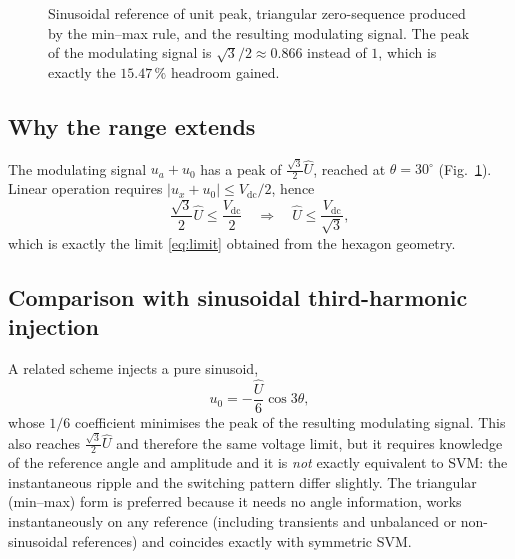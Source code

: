 \documentclass[11pt,a4paper]{article}
\newcommand{\vdc}{V_{\mathrm{dc}}}
\begin{document}
\begin{figure}[h]
\centering
{}
\caption{Sinusoidal reference of unit peak, triangular zero-sequence produced by the
min--max rule, and the resulting modulating signal. The peak of the modulating signal
is $\sqrt{3}/2 \approx 0.866$ instead of $1$, which is exactly the $15.47\,\%$
headroom gained.}
\label{fig:inj}
\end{figure}

\subsection{Why the range extends}

The modulating signal $u_a + u_0$ has a peak of $\tfrac{\sqrt{3}}{2}\hat U$, reached
at $\theta = 30^\circ$ (Fig.~\ref{fig:inj}). Linear operation requires
$\left| u_x + u_0 \right| \le \vdc/2$, hence
\begin{equation}
\frac{\sqrt{3}}{2}\hat U \le \frac{\vdc}{2}
\quad\Longrightarrow\quad
\hat U \le \frac{\vdc}{\sqrt{3}},
\end{equation}
which is exactly the limit \eqref{eq:limit} obtained from the hexagon geometry.

\subsection{Comparison with sinusoidal third-harmonic injection}

A related scheme injects a pure sinusoid,
\begin{equation}
u_0 = -\frac{\hat U}{6}\cos 3\theta ,
\end{equation}
whose $1/6$ coefficient minimises the peak of the resulting modulating signal. This
also reaches $\tfrac{\sqrt{3}}{2}\hat U$ and therefore the same voltage limit, but it
requires knowledge of the reference angle and amplitude and it is \emph{not} exactly
equivalent to SVM: the instantaneous ripple and the switching pattern differ slightly.
The triangular (min--max) form is preferred because it needs no angle information,
works instantaneously on any reference (including transients and unbalanced or
non-sinusoidal references) and coincides exactly with symmetric SVM.
\end{document}
